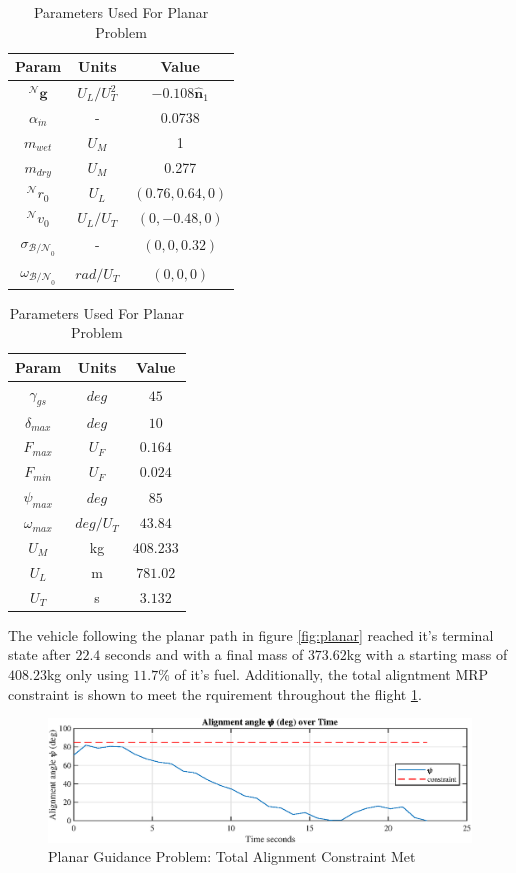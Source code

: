 \begin{table}[ht]
\caption{Parameters Used For Planar Problem}
\centering 
\begin{tabular}{c c c} 
\hline\hline
Param & Units & Value \\ [0.5ex] 
\hline 
$^\mathcal{N}\mathbf{g}$ 		& $U_L/U_T^2$ 	& $-0.108\hat{\mathbf{n}}_1$  \\ 
$\alpha_{\dot{m}}$ 				& - 			& 0.0738  \\
$m_{wet}$ 						& $U_M$ 		& 1  \\
$m_{dry}$ 						& $U_M$ 		& 0.277  \\
$^\mathcal{N}r_{0}$ 			& $U_L$ 		& $(0.76,0.64,0)$  \\
$^\mathcal{N}v_{0}$ 			& $U_L/U_T$	 	& $(0,-0.48,0)$  \\
$\sigma_{\mathcal{B/N}_0}$ 		& - 		& $(0,0,0.32)$  \\
$\omega_{\mathcal{B/N}_0}$ 		& $rad/U_T$ 	& $(0,0,0)$ \\[1ex] 
\hline
\end{tabular}
\begin{tabular}{c c c} 
\hline\hline
Param & Units & Value \\ [0.5ex] 
\hline 
$\gamma_{gs}$ 					& $deg$ 		& $45$  \\ 
$\delta_{max}$	 				& $deg$ 		& $10$  \\
$F_{max}$ 						& $U_F$ 		& $0.164$ \\
$F_{min}$ 						& $U_F$ 		& $0.024$  \\
$\psi_{max}$ 					& $deg$ 		& $85$  \\
$\omega_{max}$ 					& $deg/U_T$	 	& $43.84$  \\
$U_M$ 							& kg 			& $408.233$  \\
$U_L$					 		& m			 	& $781.02$ \\
$U_T$					 		& s			 	& $3.132$ \\[1ex] 
\hline
\end{tabular}
\label{table:tableplanar}
\end{table}

The vehicle following the planar path in figure \ref{fig:planar} reached it's terminal state after $22.4$ seconds and with a final mass of $373.62$kg with a starting mass of $408.23$kg only using $11.7$\% of it's fuel. Additionally, the total aligntment MRP constraint is shown to meet the rquirement throughout the flight \ref{fig:nplanar_align}.

\begin{figure}[!htbp] 
  \centering
  \includegraphics[width=\textwidth]{figs/planar_alignment.eps}
  \caption{Planar Guidance Problem: Total Alignment Constraint Met}
  \label{fig:nplanar_align}
 \end{figure}

